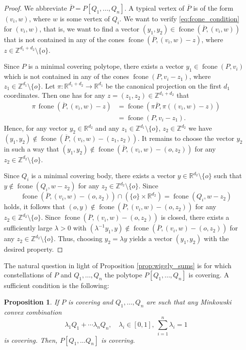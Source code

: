 \documentclass[11pt, a4paper]{amsart}
\newcommand{\RR}{\mathbb{R}}
\newcommand{\ZZ}{\mathbb{Z}}
\DeclareMathOperator{\fcone}{fcone}
\newcommand{\origin}{o}
\newcommand{\wozero}{\setminus\{\origin\}}
\numberwithin{equation}{section}
\theoremstyle{plain}
\newtheorem{proposition}[theorem]{Proposition}
\begin{document}
\begin{proof}
We abbreviate $\overline P = P[Q_1,\dots,Q_n]$.
A typical vertex of $\overline P$ is of the form $(v_i,w)$, where $w$ is some vertex of $Q_i$. We want to verify \eqref{eq:fcone_condition} for $(v_i,w)$, that is, we want to find a vector $(y_1,y_2)\in\fcone(\overline P,(v_i,w))$ that is not contained in any of the cones $\fcone(\overline P,(v_i,w)-z)$, where $z\in\ZZ^{d_1+d_2}\setminus\{\origin\}$.

Since $P$ is a minimal covering polytope, there exists a vector $y_1\in\fcone(P,v_i)$ which is not contained in any of the cones $\fcone(P,v_i-z_1)$, where $z_1\in\ZZ^{d_1}\setminus\{\origin\}$.
Let $\pi \colon\RR^{d_1+d_2} \to \RR^{d_1}$ be the canonical projection on the first $d_1$ coordinates. Then one has for any $z=(z_1,z_2)\in\ZZ^{d_1+d_2}$ that
\[\begin{split}
\pi\,\fcone(\overline P,(v_i,w)-z) &= \fcone(\pi \overline P, \pi((v_i,w)-z))\\
& = \fcone(P, v_i - z_1).
\end{split}\]
Hence, for any vector $y_2\in\RR^{d_2}$ and any $z_1\in\ZZ^{d_1}\wozero$, $z_2\in\ZZ^{d_2}$ we have $(y_1,y_2)\not\in\fcone(\overline P, (v_i,w) - (z_1,z_2))$. It remains to choose the vector $y_2$ in such a way that $(y_1,y_2)\not\in \fcone(\overline P, (v_i,w) - (\origin,z_2))$ for any $z_2\in\ZZ^{d_2}\wozero$.

Since $Q_i$ is a minimal covering body, there exists a vector $y\in\RR^{d_2}\wozero$ such that $y\not\in \fcone(Q_i,w-z_2)$ for any $z_2\in\ZZ^{d_2}\wozero$. Since 
\[
\fcone(\overline P, (v_i,w) - (\origin,z_2)) \cap (\{\origin\}\times \RR^{d_2}) = \fcone(Q_i,w-z_2)
\]
holds, it follows that
\(
(\origin,y)\not\in\fcone(\overline P, (v_i,w) - (\origin,z_2))
\) for any $z_2\in\ZZ^{d_2}\wozero$.
Since $\fcone(\overline P, (v_i,w) - (\origin,z_2))$ is closed, there exists a sufficiently large $\lambda > 0 $ with $(\lambda^{-1}y_1,y)\not\in \fcone(\overline P, (v_i,w) - (\origin,z_2))$ for any $z_2\in\ZZ^{d_2}\wozero$. Thus, choosing $y_2 = \lambda y$ yields a vector $(y_1,y_2)$ with the desired property.
\end{proof}
The natural question in light of Proposition \ref{prop:wiggly_sums} is for which constellations of $P$ and $Q_1,\dots,Q_n$ the polytope $P[Q_1,\dots,Q_n]$ is covering. A sufficient condition is the following:

\begin{proposition}
\label{prop:tensor}
If $P$ is covering and $Q_1,\dots,Q_n$ are such that any Minkowski convex combination
\[
\lambda_1Q_1 + \cdots \lambda_nQ_n,\quad \lambda_i\in [0,1],~\sum_{i=1}^n\lambda_i = 1
\]
is covering. Then, $P[Q_1,\dots Q_n]$ is covering.
\end{proposition}
\end{document}
